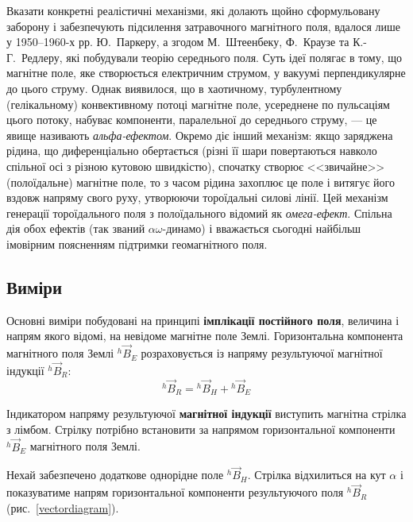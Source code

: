 Вказати конкретні реалістичні механізми, які долають щойно сформульовану заборону і забезпечують підсилення затравочного магнітного поля, вдалося лише у 1950--1960-х рр. Ю.~Паркеру, а згодом М.~Штеенбеку, Ф.~Краузе та К.-Г.~Редлеру, які побудували теорію середнього поля. Суть ідеї полягає в тому, що магнітне поле, яке створюється електричним струмом, у вакуумі перпендикулярне до цього струму. Однак виявилося, що в хаотичному, турбулентному (гелікальному) конвективному потоці магнітне поле, усереднене по пульсаціям цього потоку, набуває компоненти, паралельної до середнього струму, --- це явище називають \emph{альфа-ефектом}. Окремо діє інший механізм: якщо заряджена рідина, що диференціально обертається (різні її шари повертаються навколо спільної осі з різною кутовою швидкістю), спочатку створює <<звичайне>> (полоїдальне) магнітне поле, то з часом рідина захоплює це поле і витягує його вздовж напряму свого руху, утворюючи тороїдальні силові лінії. Цей механізм генерації тороїдального поля з полоїдального відомий як \emph{омега-ефект}. Спільна дія обох ефектів (так званий $\alpha\omega$-динамо) і вважається сьогодні найбільш імовірним поясненням підтримки геомагнітного поля.

\subsection{Виміри}

Основні виміри %
побудовані на принципі \textbf{імплікації постійного поля}, величина і напрям якого відомі, на невідоме магнітне поле Землі. Горизонтальна компонента магнітного поля Землі
$ {}^{h}\vec{B}_{E} $ %
розраховується із напряму результуючої магнітної індукції ${}^{h}\vec{B}_{R}$:
%
\begin{equation} \label{Horizontalcomponent} %
    {}^{h}\vec{B}_{R} =  {}^{h}\vec{B}_{H} +  {}^{h}\vec{B}_{E}
\end{equation}


Індикатором напряму результуючої \textbf{магнітної індукції} виступить магнітна стрілка з лімбом. Стрілку потрібно встановити за напрямом горизонтальної компоненти $ {}^{h}\vec{B}_{E} $ магнітного поля Землі.

Нехай забезпечено
додаткове однорідне поле $ {}^{h}\vec{B}_{H} $.
Стрілка відхилиться на кут $\alpha$ і показуватиме напрям горизонтальної компоненти результуючого поля ${}^{h}\vec{B}_{R}$ (рис.~\ref{vectordiagram}).


